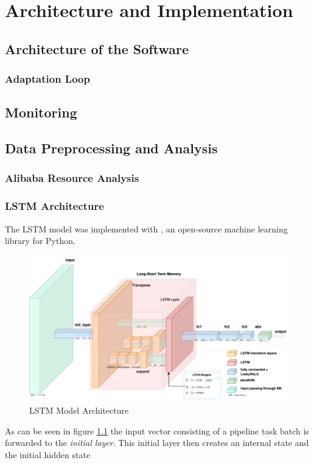 \chapter{Architecture and Implementation}
\label{ch:architecture-and-implementation}

\section{Architecture of the Software}

  \subsection{Adaptation Loop}

\section{Monitoring}

\section{Data Preprocessing and Analysis}

  \subsection{Alibaba Resource Analysis}
  \subsection{LSTM Architecture}
  \label{sec:lstm-architecture-and-implementation}

    The LSTM model was implemented with , an open-source machine learning library for Python.
    \begin{figure}
      \centering
      \includegraphics[scale=0.5]{figures/current_lstm_model.png}
      \caption{LSTM Model Architecture}
      \label{fig:lstm-model-architecture}
    \end{figure}
    As can be seen in figure \ref{fig:lstm-model-architecture} the input vector consisting of a pipeline task batch is forwarded to the \emph{initial layer}. This initial layer then creates an internal state and the initial hidden state

